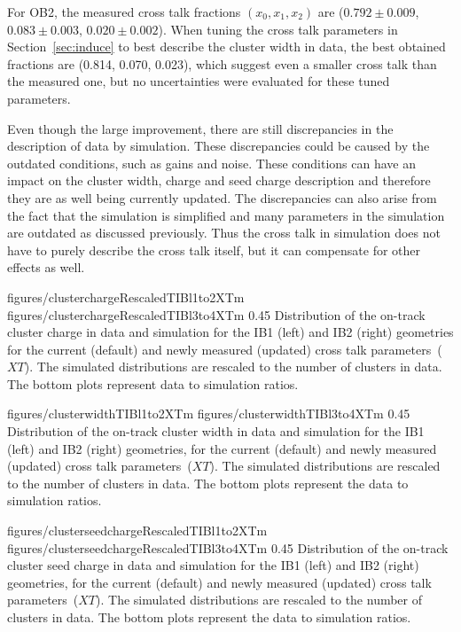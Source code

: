 For OB2, the measured cross talk fractions $(x_{0}, x_{1}, x_{2})$ are ($0.792 \pm 0.009 $, $0.083 \pm 0.003 $, $0.020 \pm 0.002$). When tuning the cross talk parameters in Section~\ref{sec:induce} to best describe the cluster width in data, the best obtained fractions are (0.814, 0.070, 0.023), which suggest even a smaller cross talk than the measured one, but no uncertainties were evaluated for these tuned parameters. 

Even though the large improvement, there are still discrepancies in the description of data by simulation. These discrepancies could be caused by the outdated conditions, such as gains and noise. These conditions can have an impact on the cluster width, charge and seed charge description and therefore they are as well being currently updated. The discrepancies can also arise from the fact that the simulation is simplified and many parameters in the simulation are outdated as discussed previously. Thus the cross talk in simulation does not have to purely describe the cross talk itself, but it can compensate for other effects as well. 


                 {figures/clusterchargeRescaledTIBl1to2XTm} %
                 {figures/clusterchargeRescaledTIBl3to4XTm} %
                 {0.45}       %
                 { Distribution of the on-track cluster charge in data and simulation for the IB1 (left) and IB2 (right) geometries for the current (default) and newly measured (updated) cross talk parameters~($XT$).  The simulated distributions are rescaled to the number of clusters in data.  The bottom plots represent data to simulation ratios. }

                 {figures/clusterwidthTIBl1to2XTm}
                 {figures/clusterwidthTIBl3to4XTm}
                 {0.45}       %
                 { Distribution of the on-track cluster width in data and simulation for the IB1 (left) and IB2 (right) geometries, for the current (default) and newly measured (updated) cross talk parameters~($XT$).  The simulated distributions are rescaled to the number of clusters in data.  The bottom plots represent the data to simulation ratios. }

                 {figures/clusterseedchargeRescaledTIBl1to2XTm} %
                 {figures/clusterseedchargeRescaledTIBl3to4XTm} %
                 {0.45}       %
                 { Distribution of the on-track cluster seed charge in data and simulation for the IB1 (left) and IB2 (right) geometries, for the current (default) and newly measured (updated) cross talk parameters~($XT$).  The simulated distributions are rescaled to the number of clusters in data.  The bottom plots represent the data to simulation ratios. }


